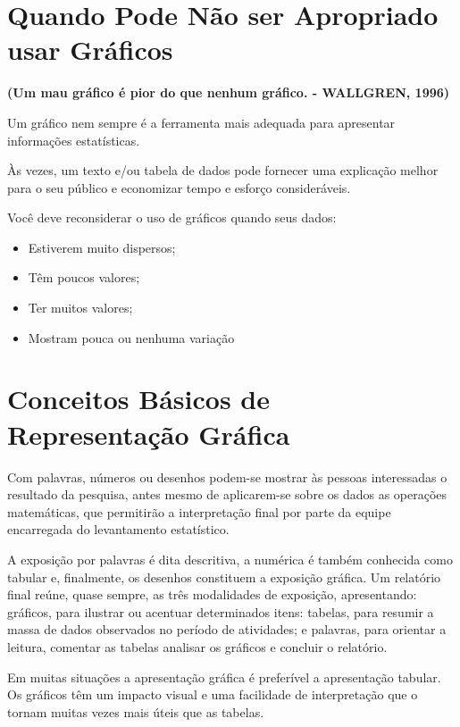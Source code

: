 \section{Quando Pode Não ser Apropriado usar Gráficos}

\textbf{(Um mau gráfico é pior do que nenhum gráfico.  - WALLGREN, 1996)} \vskip0.3cm

Um gráfico nem sempre é a ferramenta mais adequada para apresentar informações estatísticas. \vskip0.3cm

Às vezes, um texto e/ou tabela de dados pode fornecer uma explicação melhor para o seu público e economizar tempo e esforço consideráveis.\vskip0.3cm

Você deve reconsiderar o uso de gráficos quando seus dados: 

\begin{itemize}
\item Estiverem muito dispersos; 
\item Têm poucos valores; 
\item Ter muitos valores; 
\item Mostram pouca ou nenhuma variação
\end{itemize}

\newpage
\section{Conceitos Básicos de Representação Gráfica}

Com palavras, números ou desenhos podem-se mostrar às pessoas interessadas o resultado da pesquisa, antes mesmo de aplicarem-se sobre os dados as operações matemáticas, que permitirão a interpretação final por parte da equipe encarregada do levantamento estatístico.\vskip0.3cm

A exposição por palavras é dita descritiva, a numérica é também conhecida como tabular e, finalmente, os desenhos constituem a exposição gráfica. Um relatório final reúne, quase sempre, as três modalidades de exposição, apresentando: gráficos, para ilustrar ou acentuar determinados itens: tabelas, para resumir a massa de dados observados no período de atividades; e palavras, para orientar a leitura, comentar as tabelas analisar os gráficos e concluir o relatório.\vskip0.3cm

Em muitas situações a apresentação gráfica é preferível a apresentação tabular. Os gráficos têm um impacto visual e uma facilidade de interpretação que o tornam muitas vezes mais úteis que as tabelas.\vskip0.3cm

